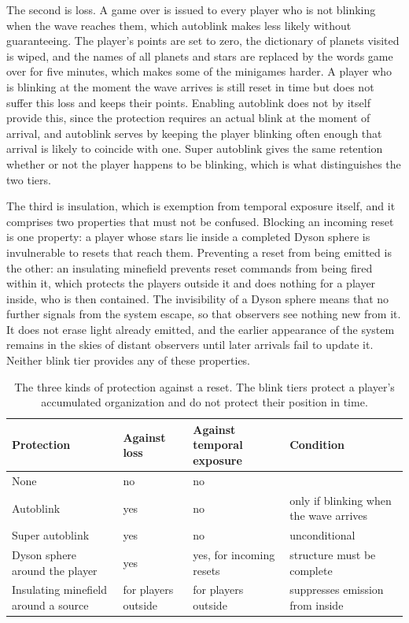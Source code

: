 \documentclass[11pt]{article}
\begin{document}
The second is loss. A game over is issued to every player who is not blinking when the wave reaches them, which autoblink makes less likely without guaranteeing. The player's points are set to zero, the dictionary of planets visited is wiped, and the names of all planets and stars are replaced by the words game over for five minutes, which makes some of the minigames harder. A player who is blinking at the moment the wave arrives is still reset in time but does not suffer this loss and keeps their points. Enabling autoblink does not by itself provide this, since the protection requires an actual blink at the moment of arrival, and autoblink serves by keeping the player blinking often enough that arrival is likely to coincide with one. Super autoblink gives the same retention whether or not the player happens to be blinking, which is what distinguishes the two tiers.

The third is insulation, which is exemption from temporal exposure itself, and it comprises two properties that must not be confused. Blocking an incoming reset is one property: a player whose stars lie inside a completed Dyson sphere is invulnerable to resets that reach them. Preventing a reset from being emitted is the other: an insulating minefield prevents reset commands from being fired within it, which protects the players outside it and does nothing for a player inside, who is then contained. The invisibility of a Dyson sphere means that no further signals from the system escape, so that observers see nothing new from it. It does not erase light already emitted, and the earlier appearance of the system remains in the skies of distant observers until later arrivals fail to update it. Neither blink tier provides any of these properties.

\begin{table}[h]
\centering
\begin{tabular}{@{}p{3.6cm}p{2.6cm}p{2.9cm}p{3.1cm}@{}}
\toprule
Protection & Against loss & Against temporal exposure & Condition \\
\midrule
None & no & no & \\
Autoblink & yes & no & only if blinking when the wave arrives \\
Super autoblink & yes & no & unconditional \\
Dyson sphere around the player & yes & yes, for incoming resets & structure must be complete \\
Insulating minefield around a source & for players outside & for players outside & suppresses emission from inside \\
\bottomrule
\end{tabular}
\caption{The three kinds of protection against a reset. The blink tiers protect a player's accumulated organization and do not protect their position in time.}
\end{table}
\end{document}
